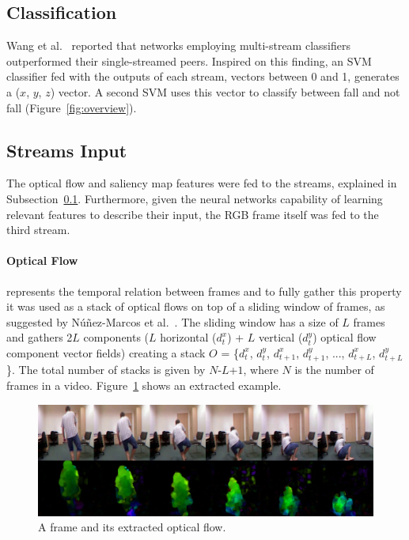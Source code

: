 \documentclass[conference]{IEEEtran}
\begin{document}
\subsection{Classification}
\label{sec:classification}

Wang et al.~\cite{wang2015towards} reported that networks employing multi-stream classifiers outperformed their single-streamed peers. Inspired on this finding, an SVM classifier fed with the outputs of each stream, vectors between 0 and 1, generates a ($x$, $y$, $z$) vector. A second SVM uses this vector to classify between fall and not fall (Figure~\ref{fig:overview}).

\subsection{Streams Input}

The optical flow and saliency map features were fed to the streams, explained in Subsection~\ref{sec:classification}. Furthermore, given the neural networks capability of learning relevant features to describe their input, the RGB frame itself was fed to the third stream.
\paragraph{Optical Flow} represents the temporal relation between frames and to fully gather this property it was used as a stack of optical flows on top of a sliding window of frames, as suggested by Núñez-Marcos et al.~\cite{nunez2017vision}. The sliding window has a size of $L$ frames and gathers 2$L$ components ($L$ horizontal ($d_t^x$) + $L$ vertical ($d_t^y$) optical flow component vector fields) creating a stack $O$ = \{$d_t^x$, $d_t^y$, $d_{t+1}^x$, $d_{t+1}^y$, ..., $d_{t+L}^x$, $d_{t+L}^y$ \}. The total number of stacks is given by $N$-$L$+$1$, where $N$ is the number of frames in a video. Figure~\ref{fig:of} shows an extracted example.
\begin{figure}[htbp]
\centerline{\includegraphics[width=\linewidth]{figures/of.png}}
\caption{A frame and its extracted optical flow.}
\label{fig:of}
\end{figure}
\end{document}
